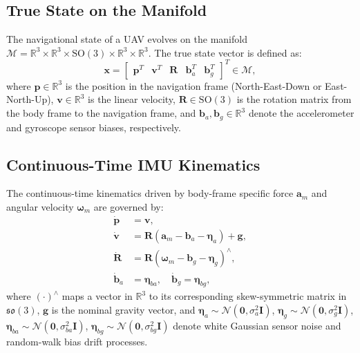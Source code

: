 \documentclass[journal,twocolumn]{IEEEtran}
\newcommand{\R}{\mathbb{R}}
\newcommand{\SO}{\mathrm{SO}(3)}
\newcommand{\so}{\mathfrak{so}(3)}
\begin{document}
\subsection{True State on the Manifold}
The navigational state of a UAV evolves on the manifold $\mathcal{M} = \R^3 \times \R^3 \times \SO \times \R^3 \times \R^3$. The true state vector is defined as:
\begin{equation}
    \mathbf{x} = \begin{bmatrix} \mathbf{p}^T & \mathbf{v}^T & \mathbf{R} & \mathbf{b}_a^T & \mathbf{b}_g^T \end{bmatrix}^T \in \mathcal{M},
\end{equation}
where $\mathbf{p} \in \R^3$ is the position in the navigation frame (North-East-Down or East-North-Up), $\mathbf{v} \in \R^3$ is the linear velocity, $\mathbf{R} \in \SO$ is the rotation matrix from the body frame to the navigation frame, and $\mathbf{b}_a, \mathbf{b}_g \in \R^3$ denote the accelerometer and gyroscope sensor biases, respectively.

\subsection{Continuous-Time IMU Kinematics}
The continuous-time kinematics driven by body-frame specific force $\mathbf{a}_m$ and angular velocity $\bm{\omega}_m$ are governed by:
\begin{align}
    \dot{\mathbf{p}} &= \mathbf{v}, \\
    \dot{\mathbf{v}} &= \mathbf{R}(\mathbf{a}_m - \mathbf{b}_a - \bm{\eta}_a) + \mathbf{g}, \\
    \dot{\mathbf{R}} &= \mathbf{R} (\bm{\omega}_m - \mathbf{b}_g - \bm{\eta}_g)^\wedge, \\
    \dot{\mathbf{b}}_a &= \bm{\eta}_{ba}, \quad \dot{\mathbf{b}}_g = \bm{\eta}_{bg},
\end{align}
where $(\cdot)^\wedge$ maps a vector in $\R^3$ to its corresponding skew-symmetric matrix in $\so$, $\mathbf{g}$ is the nominal gravity vector, and $\bm{\eta}_a \sim \mathcal{N}(\mathbf{0}, \sigma_a^2 \mathbf{I})$, $\bm{\eta}_g \sim \mathcal{N}(\mathbf{0}, \sigma_g^2 \mathbf{I})$, $\bm{\eta}_{ba} \sim \mathcal{N}(\mathbf{0}, \sigma_{ba}^2 \mathbf{I})$, $\bm{\eta}_{bg} \sim \mathcal{N}(\mathbf{0}, \sigma_{bg}^2 \mathbf{I})$ denote white Gaussian sensor noise and random-walk bias drift processes.
\end{document}
